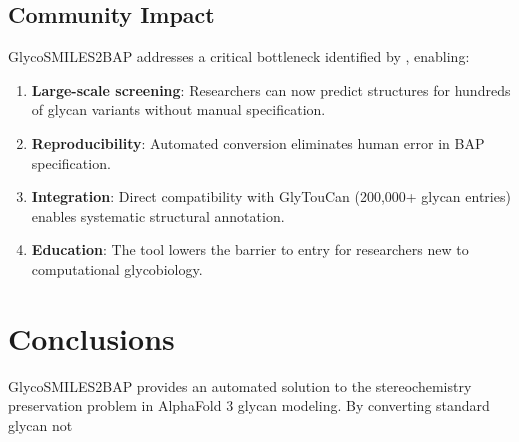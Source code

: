 \subsection{Community Impact}

GlycoSMILES2BAP addresses a critical bottleneck identified by \citet{huang2025}, enabling:

\begin{enumerate}
\item \textbf{Large-scale screening}: Researchers can now predict structures for hundreds of glycan variants without manual specification.

\item \textbf{Reproducibility}: Automated conversion eliminates human error in BAP specification.

\item \textbf{Integration}: Direct compatibility with GlyTouCan (200,000+ glycan entries) enables systematic structural annotation.

\item \textbf{Education}: The tool lowers the barrier to entry for researchers new to computational glycobiology.
\end{enumerate}

\section{Conclusions}

GlycoSMILES2BAP provides an automated solution to the stereochemistry preservation problem in AlphaFold 3 glycan modeling. By converting standard glycan not